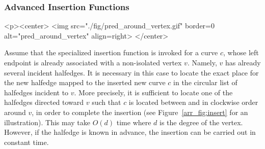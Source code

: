 \newpage
\begin{ccAdvanced}
\subsubsection{Advanced Insertion Functions\label{arr_sssec:adv_insert}}

\lcTex{%
  \setlength{\ArrangementTwoWidthRight}{2.5cm}
  \setlength{\ArrangementTwoWidthLeft}{\ArrangementTwoWidthLineReal}
  \addtolength{\ArrangementTwoWidthLeft}{-\ArrangementTwoWidthRight}
  \begin{minipage}{\ArrangementTwoWidthLeft}
}
\begin{ccHtmlOnly}
  <p><center>
    <img src="./fig/pred_around_vertex.gif" border=0 alt="pred_around_vertex" align=right>
  </center>
\end{ccHtmlOnly}
Assume that the specialized insertion function
 is invoked for a curve $c$,
whose left endpoint is already associated with a non-isolated
vertex $v$.  Namely, $v$ has already several incident halfedges. It
is necessary in this case to locate the exact place for the
new halfedge mapped to the inserted new curve $c$ in the circular
list of halfedges incident to $v$. More precisely, it is sufficient
to locate one of the halfedges  directed toward $v$ such
that $c$ is located between  and  in
clockwise order around $v$, in order to complete the insertion
(see Figure~\ref{arr_fig:insert} for an illustration). This may
take $O(d)$ time where $d$ is the degree of the vertex. However,
if the halfedge  is known in advance, the insertion can
be carried out in constant time.


\end{ccAdvanced}
